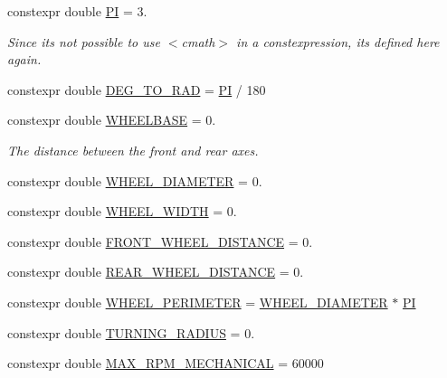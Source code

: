 \begin{DoxyCompactItemize}
\item 
constexpr double \hyperlink{namespacecar__config_a90cb9957197db8924811c447bc98703a}{PI} = 3.
\begin{DoxyCompactList}\small\item\em Since it\textquotesingle{}s not possible to use $<$cmath$>$ in a constexpression, it\textquotesingle{}s defined here again. \end{DoxyCompactList}\item 
constexpr double \hyperlink{namespacecar__config_a72deaa1a555d694e52fb768ffba1d8cb}{D\+E\+G\+\_\+\+T\+O\+\_\+\+R\+AD} = \hyperlink{namespacecar__config_a90cb9957197db8924811c447bc98703a}{PI} / 180
\item 
constexpr double \hyperlink{namespacecar__config_a4e9e4925d43a88de91b13bedafabce67}{W\+H\+E\+E\+L\+B\+A\+SE} = 0.
\begin{DoxyCompactList}\small\item\em The distance between the front and rear axes. \end{DoxyCompactList}\item 
constexpr double \hyperlink{namespacecar__config_a6f064e331d6d85d46028dfbe75f063dd}{W\+H\+E\+E\+L\+\_\+\+D\+I\+A\+M\+E\+T\+ER} = 0.
\item 
constexpr double \hyperlink{namespacecar__config_ace29186cd9605cde6edd0fd9b814df63}{W\+H\+E\+E\+L\+\_\+\+W\+I\+D\+TH} = 0.
\item 
constexpr double \hyperlink{namespacecar__config_a80d9d6f97a63ffcaba87b65a9e1e29e4}{F\+R\+O\+N\+T\+\_\+\+W\+H\+E\+E\+L\+\_\+\+D\+I\+S\+T\+A\+N\+CE} = 0.
\item 
constexpr double \hyperlink{namespacecar__config_a43e668702c6dc662ff95f80047ee5500}{R\+E\+A\+R\+\_\+\+W\+H\+E\+E\+L\+\_\+\+D\+I\+S\+T\+A\+N\+CE} = 0.
\item 
constexpr double \hyperlink{namespacecar__config_a46fe00906da07d2e030b586a634cd907}{W\+H\+E\+E\+L\+\_\+\+P\+E\+R\+I\+M\+E\+T\+ER} = \hyperlink{namespacecar__config_a6f064e331d6d85d46028dfbe75f063dd}{W\+H\+E\+E\+L\+\_\+\+D\+I\+A\+M\+E\+T\+ER} $\ast$ \hyperlink{namespacecar__config_a90cb9957197db8924811c447bc98703a}{PI}
\item 
constexpr double \hyperlink{namespacecar__config_afe308ba7ae07f7bd5af7e79a095101a9}{T\+U\+R\+N\+I\+N\+G\+\_\+\+R\+A\+D\+I\+US} = 0.
\item 
constexpr double \hyperlink{namespacecar__config_ad35069a183782259c6280aa219b72ffa}{M\+A\+X\+\_\+\+R\+P\+M\+\_\+\+M\+E\+C\+H\+A\+N\+I\+C\+AL} = 60000

\end{DoxyCompactItemize}
